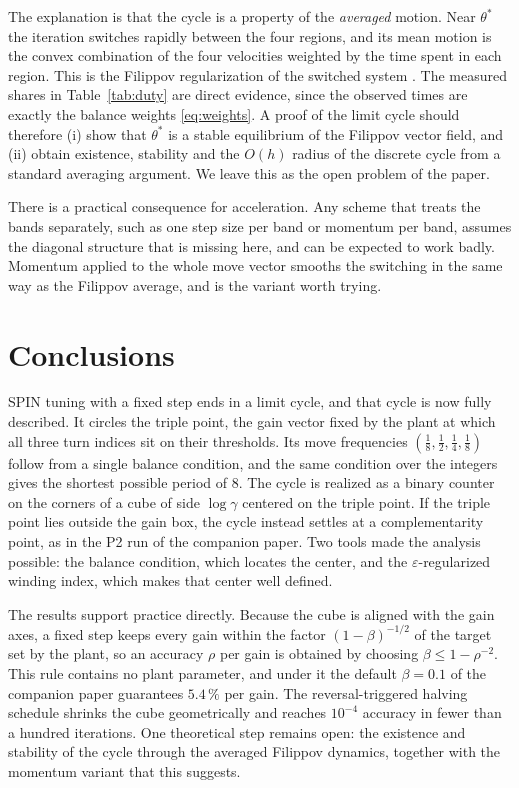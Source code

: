 \documentclass[letterpaper, 10pt, conference, twocolumn]{ieeeconf}
\begin{document}
The explanation is that the cycle is a property of the \emph{averaged}
motion. Near $\theta^*$ the iteration switches rapidly between the four
regions, and its mean motion is the convex combination of the four velocities
weighted by the time spent in each region. This is the Filippov regularization
of the switched system \cite{Filippov1988}. The measured shares in
Table~\ref{tab:duty} are direct evidence, since the observed times are exactly
the balance weights \eqref{eq:weights}. A proof of the limit cycle should
therefore (i) show that $\theta^*$ is a stable equilibrium of the Filippov
vector field, and (ii) obtain existence, stability and the $O(h)$ radius of the
discrete cycle from a standard averaging argument. We leave this as the open
problem of the paper.

There is a practical consequence for acceleration. Any scheme that treats the
bands separately, such as one step size per band or momentum per band, assumes
the diagonal structure that is missing here, and can be expected to work badly.
Momentum applied to the whole move vector smooths the switching in the same way
as the Filippov average, and is the variant worth trying.

\section{Conclusions}

SPIN tuning with a fixed step ends in a limit cycle, and that cycle is now
fully described. It circles the triple point, the gain vector fixed by the
plant at which all three turn indices sit on their thresholds. Its move
frequencies $(\tfrac18, \tfrac12, \tfrac14, \tfrac18)$ follow from a single
balance condition, and the same condition over the integers gives the shortest
possible period of $8$. The cycle is realized as a binary counter on the
corners of a cube of side $\log\gamma$ centered on the triple point. If the
triple point lies outside the gain box, the cycle instead settles at a
complementarity point, as in the P2 run of the companion paper. Two tools made
the analysis possible: the balance condition, which locates the center, and the
$\varepsilon$-regularized winding index, which makes that center well defined.

The results support practice directly. Because the cube is aligned with the
gain axes, a fixed step keeps every gain within the factor $(1-\beta)^{-1/2}$
of the target set by the plant, so an accuracy $\rho$ per gain is obtained by
choosing $\beta \le 1-\rho^{-2}$. This rule contains no plant parameter, and
under it the default $\beta = 0.1$ of the companion paper guarantees
$5.4\,\%$ per gain. The reversal-triggered halving schedule shrinks the cube
geometrically and reaches $10^{-4}$ accuracy in fewer than a hundred
iterations. One theoretical step remains open: the existence and stability of
the cycle through the averaged Filippov dynamics, together with the momentum
variant that this suggests.
\end{document}
